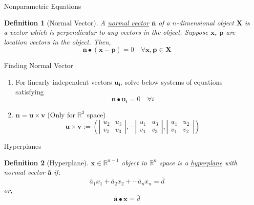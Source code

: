 \documentclass[a4paper,11pt]{article}
\newtheorem{defn}{Definition}
\begin{document}
\begin{frame}[t]{Nonparametric Equations}
	\begin{defn}
		[Normal Vector]
		A \uline{normal vector} $\bar{\mathbf{n}}$ of a $n$-dimensional object $\mathbf{X}$ is a vector which is perpendicular to any vectors in the object. Suppose $\mathbf{x}$, $\bar{\mathbf{p}}$ are location vectors in the object. Then, \[
			\bar{\mathbf{n}}\bullet(\mathbf{x}-\bar{\mathbf{p}})=0\quad \forall \mathbf{x,\bar{p}}\in\mathbf{X}
		\]
	\end{defn}
	\begin{block}
		{Finding Normal Vector}
		\begin{enumerate}
			\item For linearly independent vectors $\mathbf{u_i}$, solve below systems of equations satisfying \[
				\mathbf{n}\bullet\mathbf{u_i}=0 \quad\forall i
			\] 
			\item $\mathbf{n}=\mathbf{u} \times \mathbf{v}$ (Only for $\mathbb{R}^3$ space)
			\[
				\mathbf{u} \times \mathbf{v} := \left(\left|\begin{matrix}
					u_2 & u_3 \\ v_2 & v_3
				\end{matrix}\right|,-\left|\begin{matrix}
					u_1&u_3\\ v_1 & v_3 
				\end{matrix}\right|,\left|\begin{matrix}
					u_1&u_2\\v_1&v_2
				\end{matrix}\right|\right)
			\]
		\end{enumerate}
	\end{block}
\end{frame}

\begin{frame}[t]{Hyperplanes}
	\begin{defn}
		[Hyperplane]
		$\mathbf{x}\in\mathbb{R}^{n-1}$ object in $\mathbb{R}^n$ space is a \uline{hyperplane} with normal vector $\bar{\mathbf{a}}$ if:\[
			\bar{a}_1 x_1+\bar{a}_2 x_2+\cdots\bar{a}_n x_n = \bar d
		\]or, \[
			\bar{\mathbf{a}}\bullet\mathbf{x}=\bar d
		\]
	\end{defn}
\end{frame}
\end{document}
